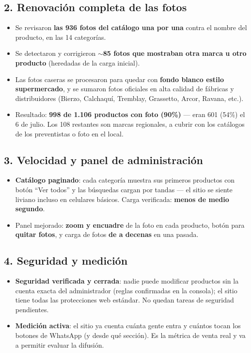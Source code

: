 \documentclass[a4paper,11pt]{article}
\begin{document}
\subsection*{2. Renovaci\'on completa de las fotos}
\begin{itemize}[leftmargin=1.2em, itemsep=2pt]
  \item Se revisaron \textbf{las 936 fotos del cat\'alogo una por una} contra el nombre
        del producto, en las 14 categor\'ias.
  \item Se detectaron y corrigieron \textbf{$\sim$85 fotos que mostraban otra marca u
        otro producto} (heredadas de la carga inicial).
  \item Las fotos caseras se procesaron para quedar con \textbf{fondo blanco estilo
        supermercado}, y se sumaron fotos oficiales en alta calidad de f\'abricas y
        distribuidores (Bierzo, Calchaqu\'i, Tremblay, Grassetto, Arcor, Ravana, etc.).
  \item Resultado: \textbf{998 de 1.106 productos con foto (90\%)} --- eran 601 (54\%)
        el 6 de julio. Los 108 restantes son marcas regionales, a cubrir con los
        cat\'alogos de los preventistas o foto en el local.
\end{itemize}

\subsection*{3. Velocidad y panel de administraci\'on}
\begin{itemize}[leftmargin=1.2em, itemsep=2pt]
  \item \textbf{Cat\'alogo paginado}: cada categor\'ia muestra sus primeros productos
        con bot\'on ``Ver todos'' y las b\'usquedas cargan por tandas --- el sitio se
        siente liviano incluso en celulares b\'asicos. Carga verificada: \textbf{menos
        de medio segundo}.
  \item Panel mejorado: \textbf{zoom y encuadre} de la foto en cada producto, bot\'on
        para \textbf{quitar fotos}, y carga de fotos \textbf{de a decenas} en una pasada.
\end{itemize}

\subsection*{4. Seguridad y medici\'on}
\begin{itemize}[leftmargin=1.2em, itemsep=2pt]
  \item \textbf{Seguridad verificada y cerrada}: nadie puede modificar productos sin la
        cuenta exacta del administrador (reglas confirmadas en la consola); el sitio
        tiene todas las protecciones web est\'andar. No quedan tareas de seguridad
        pendientes.
  \item \textbf{Medici\'on activa}: el sitio ya cuenta cu\'anta gente entra y cu\'antos
        tocan los botones de WhatsApp (y desde qu\'e secci\'on). Es la m\'etrica de
        venta real y va a permitir evaluar la difusi\'on.
\end{itemize}
\end{document}
